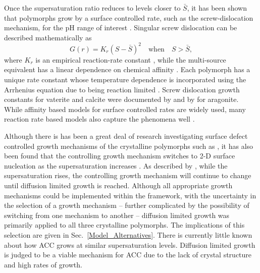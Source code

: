 \documentclass[preprint,3p,a4paper,times,12pt,authoryear]{elsarticle}
\begin{document}
Once the supersaturation ratio reduces to levels closer to $\bar{S}$, it has been shown that  polymorphs grow by a surface controlled rate, such as the screw-dislocation mechanism, for the pH range of interest \citep{Kralj1997,Collier1999,Andreassen2004,Andreassen2005,Andreassen2010,Noiriel2012}. Singular screw dislocation can be  described mathematically as
\begin{equation}\label{surface_growth}
G(r) = K_r (S-\bar{S})^2 \quad \text{when} \quad S > \bar{S} ,
\end{equation}
where $K_r$ is an empirical reaction-rate constant \citep{Kralj1990}, while the multi-source equivalent has a linear dependence on chemical affinity \citep{Noiriel2012}. Each polymorph has a unique rate constant whose temperature dependence is incorporated using the Arrhenius equation due to being reaction limited \citep{Lasaga1998}.  Screw dislocation growth constants for vaterite and calcite were documented by \cite{Kralj1990,Kralj1997} and by \cite{Romanek2011} for aragonite.  While affinity based models for surface controlled rates are widely used, many reaction rate based models also capture the phenomena well \citep{Plummer1978,Shiraki1995}.

Although there is has been a great deal of research investigating surface defect controlled growth mechanisms of the crystalline polymorphs such as \citet{Kralj1990,Kralj1997,Gutjahr1996}, it has also been found that the controlling growth mechanism switches to 2-D surface nucleation  as the supersaturation increases \citep{Teng2000,Noiriel2012}.  As described by \citet{Dirksen1991}, while the supersaturation rises, the controlling growth mechanism will continue to change until diffusion limited growth is reached.  Although all appropriate growth mechanisms could be implemented within the framework, with the uncertainty in the selection of a growth mechanism -- further complicated by the possibility of switching from  one mechanism to another -- diffusion limited growth was primarily applied to all three crystalline polymorphs. The implications of this selection are given  in Sec.~\ref{Model_Alternatives}.  There is currently little known about how ACC grows at similar supersaturation levels. Diffusion limited growth is judged to be a viable mechanism for ACC due to the lack of crystal structure and high rates of growth.  
\end{document}
